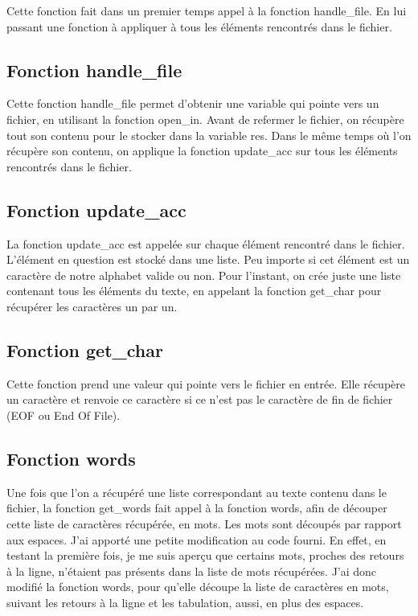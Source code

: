 \documentclass[a4paper, title page, 12pt]{report}
\begin{document}
	Cette fonction fait dans un premier temps appel à la fonction handle\_file. En lui passant une fonction à appliquer à tous les éléments rencontrés dans le fichier.
	
	\subsection{Fonction handle\_file}
	Cette fonction handle\_file permet d'obtenir une variable qui pointe vers un fichier, en utilisant la fonction open\_in. Avant de refermer le fichier, on récupère tout son contenu pour le stocker dans la variable res. Dans le même temps où l'on récupère son contenu, on applique la fonction update\_acc sur tous les éléments rencontrés dans le fichier.
	
	\subsection{Fonction update\_acc}
	La fonction update\_acc est appelée sur chaque élément rencontré dans le fichier. L'élément en question est stocké dans une liste. Peu importe si cet élément est un caractère de notre alphabet valide ou non. Pour l'instant, on crée juste une liste contenant tous les éléments du texte, en appelant la fonction get\_char pour récupérer les caractères un par un.
	
	\subsection{Fonction get\_char}	
	Cette fonction prend une valeur qui pointe vers le fichier en entrée. Elle récupère un caractère et renvoie ce caractère si ce n'est pas le caractère de fin de fichier (EOF ou End Of File). 
	
	\subsection{Fonction words}
	Une fois que l'on a récupéré une liste correspondant au texte contenu dans le fichier, la fonction get\_words fait appel à la fonction words, afin de découper cette liste de caractères récupérée, en mots. Les mots sont découpés par rapport aux espaces. J'ai apporté une petite modification au code fourni. En effet, en testant la première fois, je me suis aperçu que certains mots, proches des retours à la ligne, n'étaient pas présents dans la liste de mots récupérées.  J'ai donc modifié la fonction words, pour qu'elle découpe la liste de caractères en mots, suivant les retours à la ligne et les tabulation, aussi, en plus des espaces.
	
\end{document}
